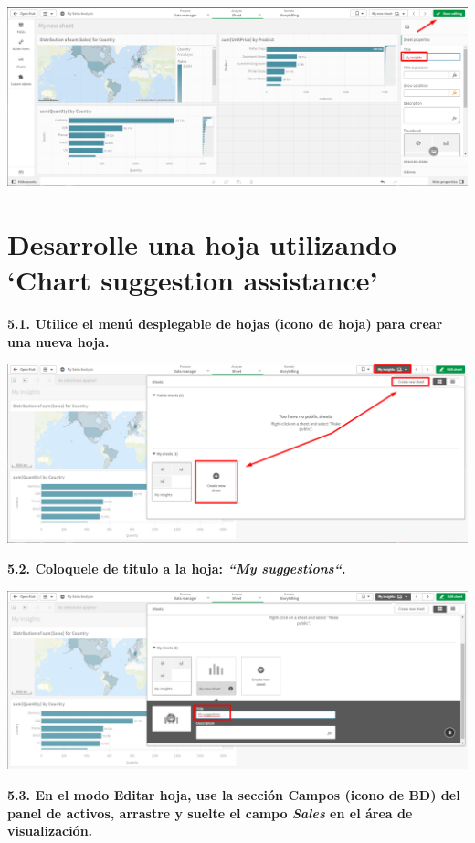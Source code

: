 \documentclass{article}
\begin{document}
    \begin{center}
		\includegraphics[width=14cm]{./images/15} 
	\end{center}
	
\newpage
\section{Desarrolle una hoja utilizando ‘Chart suggestion assistance’}

\textbf{5.1. Utilice el menú desplegable de hojas (icono de hoja) para crear una nueva hoja.}

    \begin{center}
		\includegraphics[width=14cm]{./images/16} 
	\end{center}
	
\textbf{5.2. Coloquele de titulo a la hoja: \textit{\textbf{“My suggestions“}}.}

    \begin{center}
		\includegraphics[width=14cm]{./images/16.1} 
	\end{center}
\newpage
\textbf{5.3. En el modo Editar hoja, use la sección Campos (icono de BD) del panel 
de activos, arrastre y suelte el campo \textit{\textbf{Sales}} en el área de visualización.}
\end{document}
